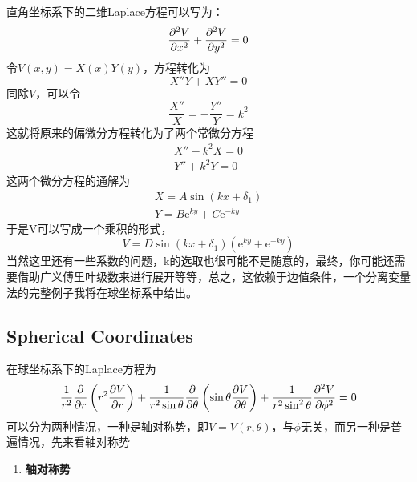 \documentclass[14pt,oneside]{book}
\begin{document}
\begin{large}
直角坐标系下的二维Laplace方程可以写为：
\begin{equation}
  \pdv[2]{V}{x}+\pdv[2]{V}{y}=0
\end{equation}
令$V(x,y)=X(x)Y(y)$，方程转化为
\begin{equation}
  X''Y+XY''=0
\end{equation}
同除$V$，可以令
\begin{equation}
  \frac{X''}{X}=-\frac{Y''}{Y}=k^2
\end{equation}
这就将原来的偏微分方程转化为了两个常微分方程
\begin{align}
	  X''-k^2X=0	\\
	  Y''+k^2Y=0
\end{align}
这两个微分方程的通解为
\begin{align}
	  X=A\sin(k x+\delta_1)	\\
	  Y=B\mathrm{e}^{ky}+C\mathrm{e}^{-ky}
\end{align}
于是V可以写成一个乘积的形式，
\begin{equation}
  V=D\sin(k x+\delta_1)(\mathrm{e}^{ky}+\mathrm{e}^{-ky})
\end{equation}
当然这里还有一些系数的问题，k的选取也很可能不是随意的，最终，你可能还需要借助广义傅里叶级数来进行展开等等，总之，这依赖于边值条件，一个分离变量法的完整例子我将在球坐标系中给出。

\subsection{Spherical Coordinates}
在球坐标系下的Laplace方程为
\begin{equation}
  \frac{1}{r^2}\pdv{}{r}\left(r^2\pdv{V}{r}\right) +\frac{1}{r^2\sin\theta}\pdv{}{\theta }\left(\sin\theta\pdv{V}{\theta}\right)+\frac{1}{r^2\sin^2\theta}\pdv[2]{V}{\phi}=0
\end{equation}
可以分为两种情况，一种是轴对称势，即$V=V(r,\theta)$，与$\phi$无关，而另一种是普遍情况，先来看轴对称势
\begin{enumerate}
  \item \textbf{轴对称势}
 

\end{enumerate}
\end{large}
\end{document}
